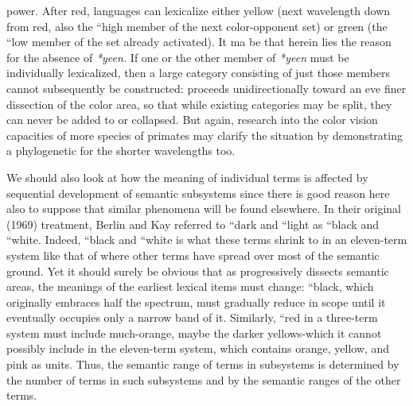 power.
After red, languages can lexicalize either yellow (next wavelength
down from red, also the ``high member of the next color-opponent set) or green (the ``low member of the set already activated). It ma be that herein lies the reason for the absence of \textit{*yeen.} If one or the other member of \textit{*yeen} must be individually lexicalized, then a large category consisting of just those members cannot subsequently be constructed:  proceeds unidirectionally toward an eve finer dissection of the color area, so that while existing categories
may be split, they can never be added to or collapsed. But again, research into the color vision capacities of more species of primates may clarify the situation by demonstrating a phylogenetic  for the shorter wavelengths too.

We should also look at how the meaning of individual terms is affected by sequential development of semantic subsystems since there is good reason here also to suppose that similar phenomena will be found elsewhere. In their original (1969) treatment, Berlin and Kay referred to ``dark and ``light as ``black and ``white. Indeed, ``black and ``white is what these terms shrink to in an eleven-term system like that of  where other terms have spread over most of the seman\-tic ground. Yet it should surely be obvious that as  pro\-gressively dissects semantic areas, the meanings of the earliest lexical items must change: ``black, which originally embraces half the spec\-trum, must gradually reduce in scope until it eventually occupies only a narrow band of it. Similarly, ``red in a three-term system must include much-orange, maybe the darker yellows-which it cannot possibly include in the eleven-term  system, which contains orange, yellow, and pink as units. Thus, the semantic range of terms in subsystems is determined by the number of terms in such subsystems and by the semantic ranges of the other terms.

